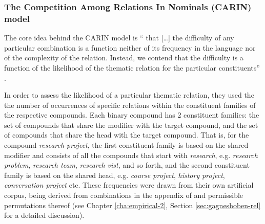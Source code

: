 

\subsubsection{The Competition Among Relations In Nominals (CARIN) model}
\label{sec:carin}

The core idea behind the CARIN model is ``
that [\dots]
the difficulty of any particular
combination is a function neither of its frequency in the language nor
of the complexity of the relation. Instead, we contend that the
difficulty is a function of the likelihood of the thematic relation
for the particular constituents'' \citep[73]{GagneandShoben:1997}. 


In order to assess the likelihood of a particular thematic relation, they
used the the number of occurrences of specific relations within the
constituent families of the respective compounds. Each binary compound has
2 constituent families: the set of compounds that share the modifier
with the target compound, and the set of compounds that share the head with the
target compound. 
That is, for the compound \emph{research project}, the first
constituent family is based on the shared modifier and consists of all the compounds that start with
\emph{research}, e.g. \emph{research problem}, \emph{research team},
\emph{research vist}, and so forth, and the second constituent family
is based on the shared head, e.g. \emph{course project}, \emph{history
project}, \emph{conversation project} etc. 
These frequencies were drawn from their own artificial corpus, being derived from
combinations in the appendix of \citet{Levi:1978} and permissible permutations thereof (see Chapter \ref{cha:empirical-2}, Section \ref{sec:gagneshoben-rel} for a detailed discussion).%

